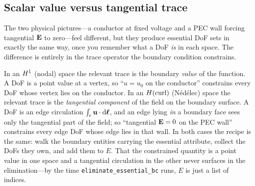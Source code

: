 \subsection{Scalar value versus tangential trace}
\label{sec:scalarvstrace}

The two physical pictures---a conductor at fixed voltage and a PEC wall forcing
tangential $\mathbf{E}$ to zero---feel different, but they produce essential DoF sets in
exactly the same way, once you remember what a DoF \emph{is} in each space. The
difference is entirely in the trace operator the boundary condition constrains.

In an $H^1$ (nodal) space the relevant trace is the boundary \emph{value} of the
function. A DoF is a point value at a vertex, so ``$u=u_0$ on the conductor''
constrains every DoF whose vertex lies on the conductor. In an $H(\mathrm{curl})$ (Nédélec)
space the relevant trace is the \emph{tangential component} of the field on the
boundary surface. A DoF is an edge circulation $\int_e \mathbf{u}\cdot\mathrm{d}\boldsymbol{\ell}$,
and an edge lying \emph{in} a boundary face sees only the tangential part of the
field; so ``tangential $\mathbf{E}=0$ on the PEC wall'' constrains every edge DoF whose
edge lies in that wall. In both cases the recipe is the same: walk the boundary
entities carrying the essential attribute, collect the DoFs they own, and add them
to $E$. That the constrained quantity is a point value in one space and a
tangential circulation in the other never surfaces in the elimination---by the
time \texttt{eliminate\_essential\_bc} runs, $E$ is just a list of indices.

